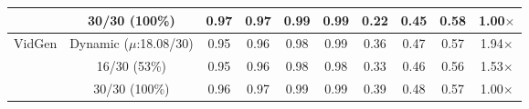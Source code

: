 \begin{table*}[!t]
{\begin{tabular}{l|c|ccccc|cc|c}
                & 30/30 (100\%)            & 0.97 & 0.97 & 0.99 & 0.99 & 0.22 & 0.45 & 0.58 & 1.00$\times$ \\ \toprule[1pt] 
\multirow{3}{*}{VidGen} 
                & Dynamic ($\mu$:18.08/30) & 0.95 &  0.96& 0.98 & 0.99 & 0.36  & 0.47  & 0.57  & 1.94$\times$ \\ \cline{2-10} 
                & 16/30 (53\%)             & 0.95 & 0.96 & 0.98 & 0.98 & 0.33 & 0.46  & 0.56 & 1.53$\times$ \\
                & 30/30 (100\%)            & 0.96 & 0.97 & 0.99 & 0.99 & 0.39 & 0.48 & 0.57 & 1.00$\times$ \\ \toprule[1pt] 
\end{tabular}%
}
\label{tab:leap}
\end{table*}
